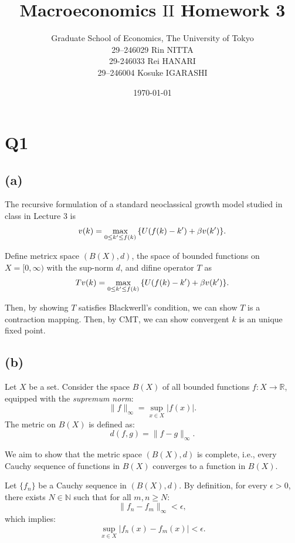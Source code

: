 \documentclass{ltjsarticle}
\title{Macroeconomics $\mathrm{II}$ Homework 3}
\date{\today}
\author{Graduate School of Economics, The University of Tokyo\\[4mm]29--246029 Rin NITTA\\ 29-246033 Rei HANARI \\ 29--246004 Kosuke IGARASHI}
\begin{document}
\maketitle
\section*{Q1}
\subsection*{(a)}


The recursive formulation of a standard neoclassical growth
model studied in class in Lecture 3 is
\begin{align*}
    v(k)=\max_{0\leq k'\leq f(k)} \qty{U(f(k)-k')+\beta v(k')}.
\end{align*}


Define metricx space $(B(X),d)$, the space of bounded functions on $X=[0,\infty)$ with the sup-norm $d$, and difine operator $T$ as 
\begin{align*}
    Tv(k)=\max_{0\leq k'\leq f(k)} \qty{U(f(k)-k')+\beta v(k')}.
\end{align*}

Then, by showing $T$ satisfies Blackwerll's condition, we can show $T$ is a contraction mapping. Then, by CMT, we can show convergent $k$ is an unique fixed point.


\subsection*{(b)}

Let $X$ be a set. Consider the space $B(X)$ of all bounded functions $f: X \to \mathbb{R}$, equipped with the \textit{supremum norm}:
\[
\|f\|_{\infty} = \sup_{x \in X} |f(x)|.
\]
The metric on $B(X)$ is defined as:
\[
d(f, g) = \|f - g\|_{\infty}.
\]

We aim to show that the metric space $(B(X), d)$ is complete, i.e., every Cauchy sequence of functions in $B(X)$ converges to a function in $B(X)$.

Let $\{f_n\}$ be a Cauchy sequence in $(B(X), d)$. By definition, for every $\epsilon > 0$, there exists $N \in \mathbb{N}$ such that for all $m, n \geq N$:
\[
\|f_n - f_m\|_{\infty} < \epsilon,
\]
which implies:
\[
\sup_{x \in X} |f_n(x) - f_m(x)| < \epsilon.
\]
\end{document}
